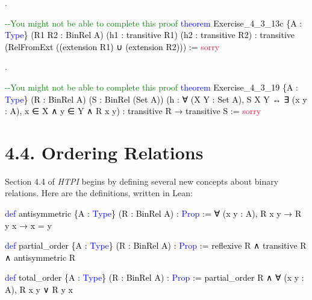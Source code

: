 \documentclass[
  letterpaper,
  DIV=11,
  numbers=noendperiod]{scrreprt}
\newenvironment{Shaded}{\begin{snugshade}}{\end{snugshade}}
\newcommand{\CommentTok}[1]{\textcolor[rgb]{0.37,0.37,0.37}{#1}}
\newcommand{\ConstantTok}[1]{\textcolor[rgb]{0.56,0.35,0.01}{#1}}
\newcommand{\KeywordTok}[1]{\textcolor[rgb]{0.00,0.23,0.31}{#1}}
\newcommand{\NormalTok}[1]{\textcolor[rgb]{0.00,0.23,0.31}{#1}}
\renewcommand{\NormalTok}[1]{\textcolor[HTML]{000000}{#1}}
\renewcommand{\KeywordTok}[1]{\textcolor[HTML]{0000FF}{#1}}
\renewcommand{\CommentTok}[1]{\textcolor[HTML]{008000}{#1}}
\renewcommand{\ConstantTok}[1]{\textcolor[HTML]{DC143C}{#1}}
\newcommand{\nobreakShaded}{\renewenvironment{Shaded}
	{\begin{tcolorbox}[frame hidden, enhanced, interior hidden, boxrule=0pt,
		borderline west={3pt}{0pt}{shadecolor}, sharp corners]}
	{\end{tcolorbox}}}
\newenvironment{numex}[1]
	{\begin{minipage}[t]{0.04\textwidth}\vspace{8pt}{#1}.
		\end{minipage}\nobreakShaded\begin{minipage}[t]{0.96\textwidth}\vspace{0pt}}
	{\end{minipage}}
\theoremstyle{remark}
\begin{document}
\begin{numex}{9}

\begin{Shaded}
\begin{Highlighting}[]
\CommentTok{{-}{-}You might not be able to complete this proof}
\KeywordTok{theorem}\NormalTok{ Exercise\_4\_3\_13c \{A : }\KeywordTok{Type}\NormalTok{\}}
\NormalTok{    (R1 R2 : BinRel A) (h1 : transitive R1) (h2 : transitive R2) :}
\NormalTok{    transitive (RelFromExt ((extension R1) ∪ (extension R2))) := }\ConstantTok{sorry}
\end{Highlighting}
\end{Shaded}

\end{numex}

\begin{numex}{10}

\begin{Shaded}
\begin{Highlighting}[]
\CommentTok{{-}{-}You might not be able to complete this proof}
\KeywordTok{theorem}\NormalTok{ Exercise\_4\_3\_19 \{A : }\KeywordTok{Type}\NormalTok{\} (R : BinRel A) (S : BinRel (Set A))}
\NormalTok{    (h : ∀ (X Y : Set A), S X Y ↔ ∃ (x y : A), x ∈ X ∧ y ∈ Y ∧ R x y) :}
\NormalTok{    transitive R → transitive S := }\ConstantTok{sorry}
\end{Highlighting}
\end{Shaded}

\end{numex}

\hypertarget{ordering-relations}{%
\section{4.4. Ordering Relations}\label{ordering-relations}}

Section 4.4 of \emph{HTPI} begins by defining several new concepts about
binary relations. Here are the definitions, written in Lean:

\begin{Shaded}
\begin{Highlighting}[]
\KeywordTok{def}\NormalTok{ antisymmetric \{A : }\KeywordTok{Type}\NormalTok{\} (R : BinRel A) : }\KeywordTok{Prop}\NormalTok{ :=}
\NormalTok{  ∀ (x y : A), R x y → R y x → x = y}

\KeywordTok{def}\NormalTok{ partial\_order \{A : }\KeywordTok{Type}\NormalTok{\} (R : BinRel A) : }\KeywordTok{Prop}\NormalTok{ :=}
\NormalTok{  reflexive R ∧ transitive R ∧ antisymmetric R}

\KeywordTok{def}\NormalTok{ total\_order \{A : }\KeywordTok{Type}\NormalTok{\} (R : BinRel A) : }\KeywordTok{Prop}\NormalTok{ :=}
\NormalTok{  partial\_order R ∧ ∀ (x y : A), R x y ∨ R y x}
\end{Highlighting}
\end{Shaded}
\end{document}
